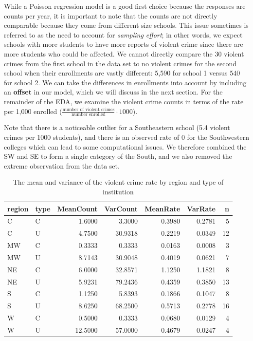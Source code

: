 \documentclass[
]{krantz}
\begin{document}
While a Poisson regression model is a good first choice because the responses are counts per year, it is important to note that the counts are not directly comparable because they come from different size schools. This issue sometimes is referred to as the need to account for \emph{sampling effort}; in other words, we expect schools with more students to have more reports of violent crime since there are more students who could be affected. We cannot directly compare the 30 violent crimes from the first school in the data set to no violent crimes for the second school when their enrollments are vastly different: 5,590 for school 1 versus 540 for school 2. We can take the differences in enrollments into account by including an \textbf{offset} in our model, which we will discuss in the next section. For the remainder of the EDA, we examine the violent crime counts in terms of the rate per 1,000 enrolled (\(\frac{\textrm{number of violent crimes}}{\textrm{number enrolled}} \cdot 1000\)).

Note that there is a noticeable outlier for a Southeastern school (5.4 violent crimes per 1000 students), and there is an observed rate of 0 for the Southwestern colleges which can lead to some computational issues. We therefore combined the SW and SE to form a single category of the South, and we also removed the extreme observation from the data set.

\begin{table}

\caption{\label{tab:table4ch4}The mean and variance of the violent crime rate by region and type of institution}
\centering
\begin{tabular}[t]{llrrrrr}
\toprule
region & type & MeanCount & VarCount & MeanRate & VarRate & n\\
\midrule
C & C & 1.6000 & 3.3000 & 0.3980 & 0.2781 & 5\\
C & U & 4.7500 & 30.9318 & 0.2219 & 0.0349 & 12\\
MW & C & 0.3333 & 0.3333 & 0.0163 & 0.0008 & 3\\
MW & U & 8.7143 & 30.9048 & 0.4019 & 0.0621 & 7\\
NE & C & 6.0000 & 32.8571 & 1.1250 & 1.1821 & 8\\
\addlinespace
NE & U & 5.9231 & 79.2436 & 0.4359 & 0.3850 & 13\\
S & C & 1.1250 & 5.8393 & 0.1866 & 0.1047 & 8\\
S & U & 8.6250 & 68.2500 & 0.5713 & 0.2778 & 16\\
W & C & 0.5000 & 0.3333 & 0.0680 & 0.0129 & 4\\
W & U & 12.5000 & 57.0000 & 0.4679 & 0.0247 & 4\\
\bottomrule
\end{tabular}
\end{table}
\end{document}
